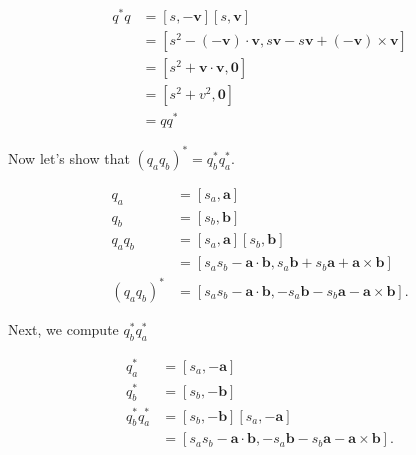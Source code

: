 $$
    \begin{aligned}
        q^{*} q & =[s,-\mathbf{v}][s, \mathbf{v}]                                                                               \\
                & =\left[s^{2}-(-\mathbf{v}) \cdot \mathbf{v}, s \mathbf{v}-s \mathbf{v}+(-\mathbf{v}) \times \mathbf{v}\right] \\
                & =\left[s^{2}+\mathbf{v} \cdot \mathbf{v}, \mathbf{0}\right]                                                   \\
                & =\left[s^{2}+v^{2}, \mathbf{0}\right]                                                                         \\
                & =q q^{*}
    \end{aligned}
$$

Now let's show that $\left(q_{a} q_{b}\right)^{*}=q_{b}^{*} q_{a}^{*}$.

$$
    \begin{aligned}
        q_{a}                        & =\left[s_{a}, \mathbf{a}\right]                                                                                         \\
        q_{b}                        & =\left[s_{b}, \mathbf{b}\right]                                                                                         \\
        q_{a} q_{b}                  & =\left[s_{a}, \mathbf{a}\right]\left[s_{b}, \mathbf{b}\right]                                                           \\
                                     & =\left[s_{a} s_{b}-\mathbf{a} \cdot \mathbf{b}, s_{a} \mathbf{b}+s_{b} \mathbf{a}+\mathbf{a} \times \mathbf{b}\right]   \\
        \left(q_{a} q_{b}\right)^{*} & =\left[s_{a} s_{b}-\mathbf{a} \cdot \mathbf{b},-s_{a} \mathbf{b}-s_{b} \mathbf{a}-\mathbf{a} \times \mathbf{b}\right] .
    \end{aligned}
$$

Next, we compute $q_{b}^{*} q_{a}^{*}$

$$
    \begin{aligned}
        q_{a}^{*}           & =\left[s_{a},-\mathbf{a}\right]                                                                                         \\
        q_{b}^{*}           & =\left[s_{b},-\mathbf{b}\right]                                                                                         \\
        q_{b}^{*} q_{a}^{*} & =\left[s_{b},-\mathbf{b}\right]\left[s_{a},-\mathbf{a}\right]                                                           \\
                            & =\left[s_{a} s_{b}-\mathbf{a} \cdot \mathbf{b},-s_{a} \mathbf{b}-s_{b} \mathbf{a}-\mathbf{a} \times \mathbf{b}\right] .
    \end{aligned}
$$

